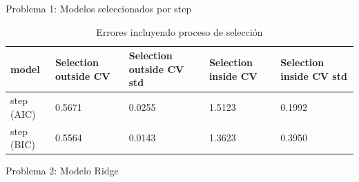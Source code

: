 \documentclass[notheorems]{beamer}
\begin{document}
\begin{frame}{Problema 1: Modelos seleccionados por step}
    \begin{table}
        \begin{tabular}{p{2cm}|p{1.5cm}|p{1.5cm}|p{1.5cm}|p{1.5cm}}
            \toprule
                  model &  Selection outside CV &  Selection outside CV std &  Selection inside CV &  Selection inside CV std \\
            \midrule
             step (AIC) &                0.5671 &                    0.0255 &               1.5123 &                   0.1992 \\
             step (BIC) &                0.5564 &                    0.0143 &               1.3623 &                   0.3950 \\
            \bottomrule
        \end{tabular}
        \caption{Errores incluyendo proceso de selección}
    \end{table}
\end{frame}
\begin{frame}{Problema 2: Modelo Ridge}
    \begin{figure}
    \centering
        \caption{}
    \end{figure}
\end{frame}
\end{document}
